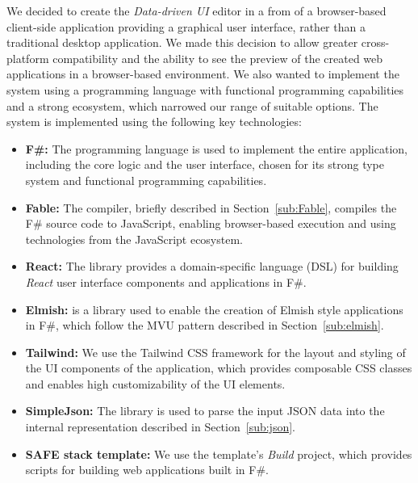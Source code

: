 We decided to create the \emph{Data-driven UI} editor in a from of a browser-based client-side application providing a graphical user interface, rather than a traditional desktop application.
We made this decision to allow greater cross-platform compatibility and the ability to see the preview of the created web applications in a browser-based environment.
We also wanted to implement the system using a programming language with functional programming capabilities and a strong ecosystem, which narrowed our range of suitable options.
The system is implemented using the following key technologies:
\begin{itemize}
	\item \textbf{F\#:} The \citet{fsharp} programming language is used to implement the entire application, including the core logic and the user interface, chosen for its strong type system and functional programming capabilities.
	\item \textbf{Fable:} The \citet{fable} compiler, briefly described in Section~\ref{sub:Fable}, compiles the F\# source code to JavaScript, enabling browser-based execution and using technologies from the JavaScript ecosystem.
	\item \textbf{React:} The \citet{feliz} library provides a domain-specific language (DSL) for building \emph{React} user interface components and applications in F\#.
	\item \textbf{Elmish:} \citet{elmish} is a library used to enable the creation of Elmish style applications in F\#, which follow the MVU pattern described in Section~\ref{sub:elmish}.
	\item \textbf{Tailwind:} We use the Tailwind CSS framework for the layout and styling of the UI components of the application, which provides composable CSS classes and enables high customizability of the UI elements.
	\item \textbf{SimpleJson:} The \citet{simpleJson} library is used to parse the input JSON data into the internal representation described in Section~\ref{sub:json}.
	\item \textbf{SAFE stack template:} We use the \citet{safestack} template's \emph{Build} project, which provides scripts for building web applications built in F\#.
\end{itemize}

